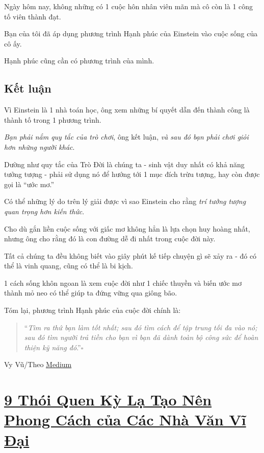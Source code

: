 \documentclass{book}
\numberwithin{equation}{section}
\begin{document}
%
Ngày hôm nay, không những có 1 cuộc hôn nhân viên mãn mà cô còn là 1 công tố viên thành đạt.

Bạn của tôi đã áp dụng phương trình Hạnh phúc của Einstein vào cuộc sống của cô ấy.

\textsf{Hạnh phúc cũng cần có phương trình của mình.}

\section{Kết luận}
Vì Einstein là 1 nhà toán học, ông xem những bí quyết dẫn đến thành công là thành tố trong 1 phương trình.

\textit{Bạn phải nắm quy tắc của trò chơi}, ông kết luận, \textit{và sau đó bạn phải chơi giỏi hơn những người khác}.

%
Dường như quy tắc của Trò Đời là chúng ta - sinh vật duy nhất có khả năng tưởng tượng - phải sử dụng nó để hướng tới 1 mục đích trừu tượng, hay còn được gọi là ``ước mơ.''

%
Có thể những lý do trên lý giải được vì sao Einstein cho rằng \textit{trí tưởng tượng quan trọng hơn kiến thức}.

Cho dù gắn liền cuộc sống với giấc mơ không hẳn là lựa chọn huy hoàng nhất, nhưng ông cho rằng đó là con đường dễ đi nhất trong cuộc đời này.

%
Tất cả chúng ta đều không biết vào giây phút kế tiếp chuyện gì sẽ xảy ra - đó có thể là vinh quang, cũng có thể là bi kịch.

1 cách sống khôn ngoan là xem cuộc đời như 1 chiếc thuyền và biến ước mơ thành mỏ neo có thể giúp ta đứng vững qua giông bão.

%
Tóm lại, phương trình Hạnh phúc của cuộc đời chính là:
\begin{quotation}
    ``\textit{Tìm ra thứ bạn làm tốt nhất; sau đó tìm cách để tập trung tối đa vào nó; sau đó tìm người trả tiền cho bạn vì bạn đã dành toàn bộ công sức để hoàn thiện kỹ năng đó}.''\hfill$\square$
\end{quotation}

\begin{flushright}
    Vy Vũ/Theo \href{https://medium.com/mind-cafe/einsteins-formula-for-a-happy-life-b29aff61a9c7}{Medium}
\end{flushright}


\chapter{\href{http://tramdoc.vn/tin-tuc/9-thoi-quen-ky-la-tao-nen-phong-cach-cua-cac-nha-van-vi-dai-nmwejW.html}{9 Thói Quen Kỳ Lạ Tạo Nên Phong Cách của Các Nhà Văn Vĩ Đại}}
\end{document}
